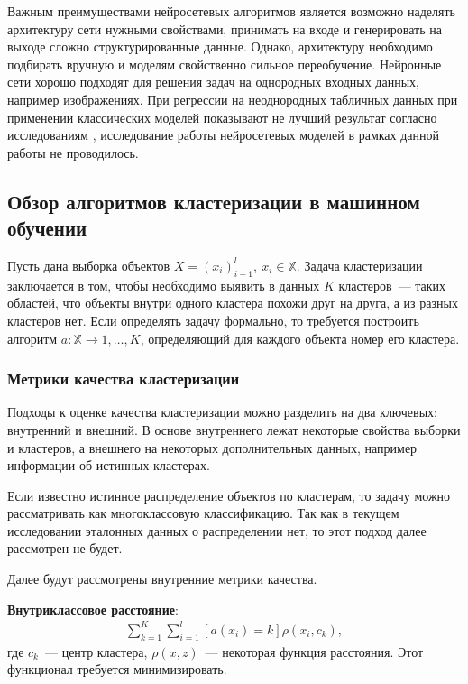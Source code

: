 \documentclass[12pt,a4paper]{article} %
\begin{document}
Важным преимуществами нейросетевых алгоритмов является возможно наделять архитектуру сети нужными свойствами, принимать на входе и генерировать на выходе сложно структурированные данные. Однако, архитектуру необходимо подбирать вручную и моделям свойственно сильное переобучение. Нейронные сети хорошо подходят для решения задач на однородных входных данных, например изображениях. При регрессии на неоднородных табличных данных при применении классических моделей показывают не лучший результат согласно исследованиям \cite{Chen2}, исследование работы нейросетевых моделей в рамках данной работы не проводилось.

\subsection{Обзор алгоритмов  кластеризации в машинном обучении}

Пусть дана выборка объектов $X = (x_i)_{i-1}^{l},~x_i\in\mathbb{X}$. Задача кластеризации заключается в том, чтобы необходимо выявить в данных $K$ кластеров~--- таких областей, что объекты внутри одного кластера похожи друг на друга, а из разных кластеров нет. Если определять задачу формально, то требуется построить алгоритм $a: \mathbb{X}\rightarrow{1,\dots,K}$, определяющий для каждого объекта номер его кластера.

\subsubsection{Метрики качества кластеризации}
Подходы к оценке качества кластеризации можно разделить на два ключевых: внутренний и внешний. В основе внутреннего лежат некоторые свойства выборки и кластеров, а внешнего на некоторых дополнительных данных, например информации об истинных кластерах.

Если известно истинное распределение объектов по кластерам, то задачу можно рассматривать как многоклассовую классификацию. Так как в текущем исследовании эталонных данных о распределении нет, то этот подход далее рассмотрен не будет.

Далее будут рассмотрены внутренние метрики качества. 

\textbf{Внутриклассовое расстояние}:
\begin{gather}\label{klastdist1}
	\sum\limits_{k=1}^{K}\sum\limits_{i=1}^{l}[a(x_i)=k]\rho(x_i, c_k),
\end{gather}
где $c_k$~--- центр кластера, $\rho(x,z)$~--- некоторая функция расстояния. Этот функционал требуется минимизировать.
\end{document}
